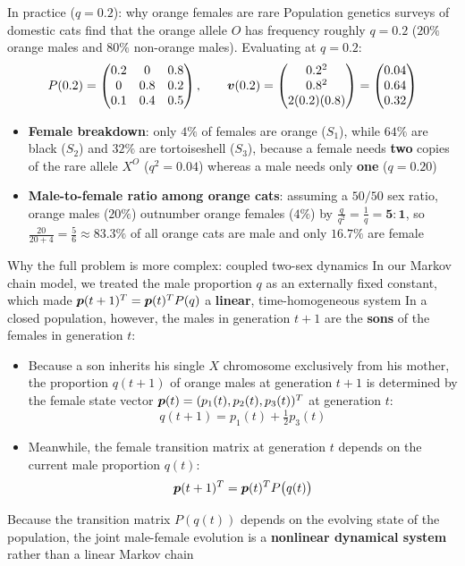 \documentclass[aspectratio=169]{beamer}\usepackage[]{graphicx}\usepackage[]{xcolor}
\begin{document}
\begin{frame}{In practice ($q = 0.2$): why orange females are rare}
Population genetics surveys of domestic cats find that the orange allele $O$ has frequency roughly \textbf{$q = 0.2$} ($20\%$ orange males and $80\%$ non-orange males). Evaluating at $q = 0.2$:
\[
P(0.2) = \begin{pmatrix}
0.2 & 0   & 0.8 \\
0   & 0.8 & 0.2 \\
0.1 & 0.4 & 0.5
\end{pmatrix},
\qquad
\bm{v}(0.2) = \begin{pmatrix}
0.2^2 \\
0.8^2 \\
2(0.2)(0.8)
\end{pmatrix}
= \begin{pmatrix}
0.04 \\
0.64 \\
0.32
\end{pmatrix}
\]
\begin{itemize}
\item \textbf{Female breakdown}: only \textbf{$4\%$} of females are orange ($S_1$), while \textbf{$64\%$} are black ($S_2$) and \textbf{$32\%$} are tortoiseshell ($S_3$), because a female needs \textbf{two} copies of the rare allele $X^O$ ($q^2 = 0.04$) whereas a male needs only \textbf{one} ($q = 0.20$)
\item \textbf{Male-to-female ratio among orange cats}: assuming a $50/50$ sex ratio, orange males ($20\%$) outnumber orange females ($4\%$) by $\frac{q}{q^2} = \frac{1}{q} = \mathbf{5 : 1}$, so $\frac{20}{20 + 4} = \frac{5}{6} \approx \mathbf{83.3\%}$ of all orange cats are male and only $\mathbf{16.7\%}$ are female
\end{itemize}
\end{frame}

\begin{frame}{Why the full problem is more complex: coupled two-sex dynamics}
In our Markov chain model, we treated the male proportion $q$ as an externally fixed constant, which made $\bm{p}(t+1)^T = \bm{p}(t)^T P(q)$ a \textbf{linear}, time-homogeneous system
\vfill
In a closed population, however, the males in generation $t+1$ are the \textbf{sons} of the females in generation $t$:
\begin{itemize}
\item Because a son inherits his single $X$ chromosome exclusively from his mother, the proportion $q(t+1)$ of orange males at generation $t+1$ is determined by the female state vector $\bm{p}(t) = (p_1(t), p_2(t), p_3(t))^T$ at generation $t$:
\[
q(t+1) = p_1(t) + \tfrac{1}{2}p_3(t)
\]
\item Meanwhile, the female transition matrix at generation $t$ depends on the current male proportion $q(t)$:
\[
\bm{p}(t+1)^T = \bm{p}(t)^T P\bigl(q(t)\bigr)
\]
\end{itemize}
\vfill
Because the transition matrix $P(q(t))$ depends on the evolving state of the population, the joint male-female evolution is a \textbf{nonlinear dynamical system} rather than a linear Markov chain
\end{frame}
\end{document}

